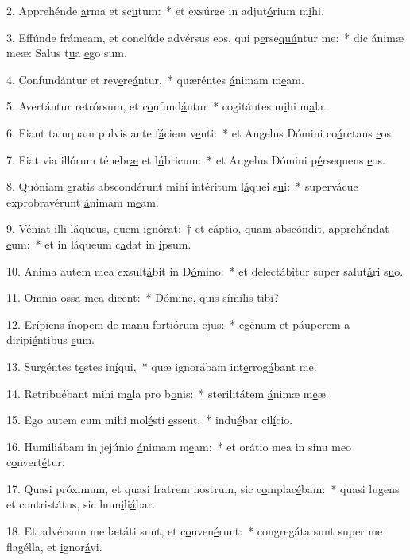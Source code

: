 2. Apprehénde \uline{a}rma et sc\uline{u}tum:~* et exsúrge in adjut\uline{ó}rium m\uline{i}hi.\par 
3. Effúnde frámeam, et conclúde advérsus eos, qui p\uline{e}rse\uline{quú}ntur me:~* dic ánimæ meæ: Salus t\uline{u}a \uline{e}go sum.\par 
4. Confundántur et rev\uline{e}re\uline{á}ntur,~* quæréntes \uline{á}nimam m\uline{e}am.\par 
5. Avertántur retrórsum, et c\uline{o}nfund\uline{á}ntur~* cogitántes m\uline{i}hi m\uline{a}la.\par 
6. Fiant tamquam pulvis ante f\uline{á}ciem v\uline{e}nti:~* et Angelus Dómini co\uline{á}rctans \uline{e}os.\par 
7. Fiat via illórum ténebr\uline{æ} et l\uline{ú}bricum:~* et Angelus Dómini p\uline{é}rsequens \uline{e}os.\par 
8. Quóniam gratis abscondérunt mihi intéritum l\uline{á}quei s\uline{u}i:~* supervácue exprobravérunt \uline{á}nimam m\uline{e}am.\par 
9. Véniat illi láqueus, quem i\uline{gnó}rat:~† et cáptio, quam abscóndit, appreh\uline{é}ndat \uline{e}um:~* et in láqueum c\uline{a}dat in \uline{i}psum.\par 
10. Anima autem mea exsult\uline{á}bit in D\uline{ó}mino:~* et delectábitur super salut\uline{á}ri s\uline{u}o.\par 
11. Omnia ossa m\uline{e}a d\uline{i}cent:~* Dómine, quis s\uline{í}milis t\uline{i}bi?\par 
12. Erípiens ínopem de manu forti\uline{ó}rum \uline{e}jus:~* egénum et páuperem a diripi\uline{é}ntibus \uline{e}um.\par 
13. Surgéntes t\uline{e}stes in\uline{í}qui,~* quæ ignorábam int\uline{e}rrog\uline{á}bant me.\par 
14. Retribuébant mihi m\uline{a}la pro b\uline{o}nis:~* sterilitátem \uline{á}nimæ m\uline{e}æ.\par 
15. Ego autem cum mihi mol\uline{é}sti \uline{e}ssent,~* indu\uline{é}bar cil\uline{í}cio.\par 
16. Humiliábam in jejúnio \uline{á}nimam m\uline{e}am:~* et orátio mea in sinu meo c\uline{o}nvert\uline{é}tur.\par 
17. Quasi próximum, et quasi fratrem nostrum, sic c\uline{o}mplac\uline{é}bam:~* quasi lugens et contristátus, sic hum\uline{i}li\uline{á}bar.\par 
18. Et advérsum me lætáti sunt, et c\uline{o}nven\uline{é}runt:~* congregáta sunt super me flagélla, et \uline{i}gnor\uline{á}vi.\par 
